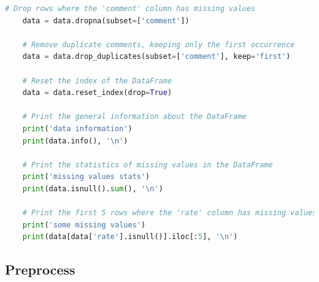 \documentclass{solutionclass} %
\begin{document}
\begin{lstlisting}[language=Python]
    # Drop rows where the 'comment' column has missing values
    data = data.dropna(subset=['comment'])
    
    # Remove duplicate comments, keeping only the first occurrence
    data = data.drop_duplicates(subset=['comment'], keep='first')
    
    # Reset the index of the DataFrame
    data = data.reset_index(drop=True)
    
    # Print the general information about the DataFrame
    print('data information')
    print(data.info(), '\n')
    
    # Print the statistics of missing values in the DataFrame
    print('missing values stats')
    print(data.isnull().sum(), '\n')
    
    # Print the first 5 rows where the 'rate' column has missing values
    print('some missing values')
    print(data[data['rate'].isnull()].iloc[:5], '\n')
\end{lstlisting}


\subsection*{Preprocess}
\end{document}

